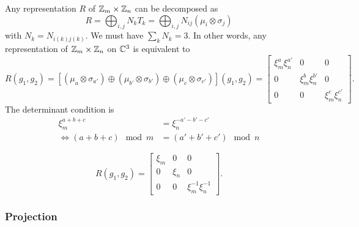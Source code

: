            Any representation $R$ of $\mathbb{Z}_m\times\mathbb{Z}_n$ can be decomposed as
           \begin{equation}
               R=\bigoplus_{i,j}N_k T_k=\bigoplus_{i,j}N_{ij}(\mu_{i}\otimes\sigma_{j})
           \end{equation}
           with $N_k=N_{i(k)j(k)}$. We must have $\sum_kN_k=3$. In other words, any representation of $\mathbb{Z}_m\times\mathbb{Z}_n$ on $\mathbb{C}^3$ is equivalent to
           \begin{equation}
                R(g_1,g_2)=[(\mu_{a}\otimes\sigma_{a'})\oplus(\mu_{b'}\otimes\sigma_{b'})\oplus(\mu_{c}\otimes\sigma_{c'})](g_1,g_2)=
               \begin{bmatrix}
                   \xi^a_m\xi^{a'}_n & 0 & 0 \\
                   0 & \xi^b_m\xi^{b'}_n & 0 \\
                   0 & 0 & \xi^c_m\xi^{c'}_n
               \end{bmatrix}.
           \end{equation}
           The determinant condition is
           \begin{align}
                \xi^{a+b+c}_m &= \xi^{-a'-b'-c'}_n\\
               \Leftrightarrow (a+b+c)\mod m &= (a'+b'+c')\mod n
           \end{align}

           

           \begin{equation}
            R(g_1,g_2)=
           \begin{bmatrix}
               \xi_m & 0 & 0 \\
               0 & \xi_n & 0 \\
               0 & 0 & \xi^{-1}_m\xi^{-1}_n
           \end{bmatrix}.
       \end{equation}

    \subsubsection{Projection}

